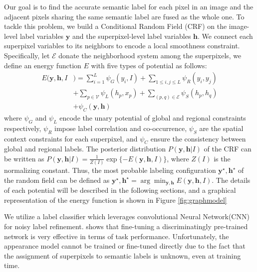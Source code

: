 Our goal is to find the accurate semantic label for each pixel in an image and the adjacent pixels sharing the same semantic label are fused as the whole one. To tackle this problem, we build a Conditional Random Field (CRF) on the image-level label variables $\boldsymbol{y}$ and the superpixel-level label variables $\boldsymbol{h}$. We connect each superpixel variables to its neighbors to encode a local smoothness constraint. Specifically, let $\mathcal{E}$ donate the neighborhood system among the superpixels, we define an energy function $E$ with five types of potential as follows:
\begin{equation}
    \label{eq:energyfunction}
    \begin{aligned}
        E(\boldsymbol{y},\boldsymbol{h},I&) = \sum_{i=1}^L{\psi_{G}(y_i,I)}
                            + \sum_{1 \le i,j \le L} {\psi_{R}(y_i,y_j)}\\ &+ \sum_{p \in \mathcal{V}}{\psi_{L}(h_p,x_p)}+ \sum_{(p,q) \in \mathcal{E}}{\psi_{S}(h_p,h_q)}\\ &+ \psi_{C}(\boldsymbol{y},\boldsymbol{h})
    \end{aligned}
\end{equation}
where $\psi_G$ and $\psi_{L}$ encode the unary potential of global and regional constraints respectively, $\psi_R$ impose label correlation and co-occurrence, $\psi_S$ are the spatial context constraints for each superpixel, and $\psi_C$ ensure the consistency between global and regional labels.  The posterior distribution $P(\boldsymbol{y},\boldsymbol{h}|I)$ of the CRF can be written as $P(\boldsymbol{y},\boldsymbol{h}|I) = \frac{1}{Z(I)}\exp{\{-E(\boldsymbol{y},\boldsymbol{h},I)\}}$, where $Z(I)$ is the normalizing constant. Thus, the most probable labeling configuration $\boldsymbol{y}^{\star},\boldsymbol{h}^{\star}$ of the random field can be defined as  $\boldsymbol{y}^{\star},\boldsymbol{h}^{\star} = \arg \min_{\boldsymbol{y},\boldsymbol{h}} E(\boldsymbol{y},\boldsymbol{h},I)$. The details of each potential will be described in the following sections, and a graphical representation of the energy function is shown in Figure \ref{fig:graphmodel}

\if
 We utilize a label classifier which leverages convolutional Neural Network(CNN) for noisy label refinement.\cite{agrawal2014analyzing} shows that fine-tuning a discriminatingly pre-trained network is very effective in terms of task performance. Unfortunately, the appearance model cannot be trained or fine-tuned directly due to the fact that the assignment of superpixels to semantic labels is unknown, even at training time.
\fi
